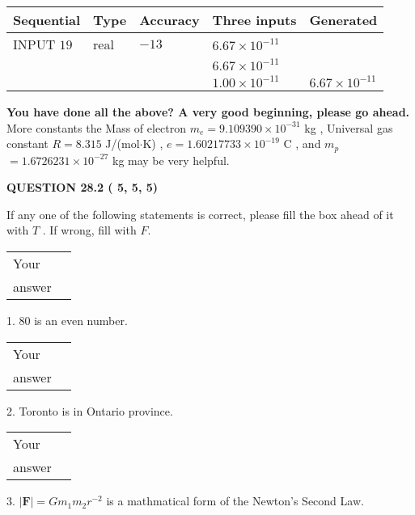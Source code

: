 \documentclass[12pt]{article}
\begin{document}
   
  
  
\noindent\begin{tabular}{|l|l|l|l|l|}
\hline
 Sequential & Type & Accuracy & Three inputs & Generated \\ 
\hline
 
 
  INPUT $          19$ & real & $         -13 $ & $
 6.67 \times 10^{-11}
  $ & \\
  & & &  $
 6.67 \times 10^{-11}
  $ & \\
  & & &  $
 1.00 \times 10^{-11}
 $ & $ 6.67 \times 10^{-11} $ 
 \\  \hline  
 \end{tabular}
   
   
   
   
\vspace{0.3in}
{\textbf{\LARGE{You have done all the above? A very good beginning, please go ahead.}}}
More constants the
Mass of electron
$m_e$$ =
9.109390 \times 10^{-31} $
kg
,
Universal gas constant
$R$$ =
8.315 $
J/(mol$\cdot $K)
,
$e$$ =
1.60217733 \times 10^{-19} $
C
, and
$m_p$$ =
1.6726231 \times 10^{-27} $
kg
%
may be very helpful.
\vspace{0.3in}
   
   
  
\vspace{0.2in}
  
{\textbf{\Large{QUESTION
28.2 
 (          5,          5,          5)
}}}
  
  
If any one of the following statements is correct, please fill the box ahead of it with $T$ .
If wrong, fill with $F$.
 
\noindent\begin{tabular}{|l|l|}\hline Your&\hspace{.2in} \\ answer&\hspace{.2in} \\ \hline \end{tabular}
1. $ %
80$ is an  %
even number.
 
\noindent\begin{tabular}{|l|l|}\hline Your&\hspace{.2in} \\ answer&\hspace{.2in} \\ \hline \end{tabular}
2.  %
Toronto is in  %
Ontario province.
 
\noindent\begin{tabular}{|l|l|}\hline Your&\hspace{.2in} \\ answer&\hspace{.2in} \\ \hline \end{tabular}
3.  %
$\left| \mathbf{F}\right| =Gm_1m_2r^{-2}$ is a mathmatical form of
the Newton's Second Law.
 
\end{document}
